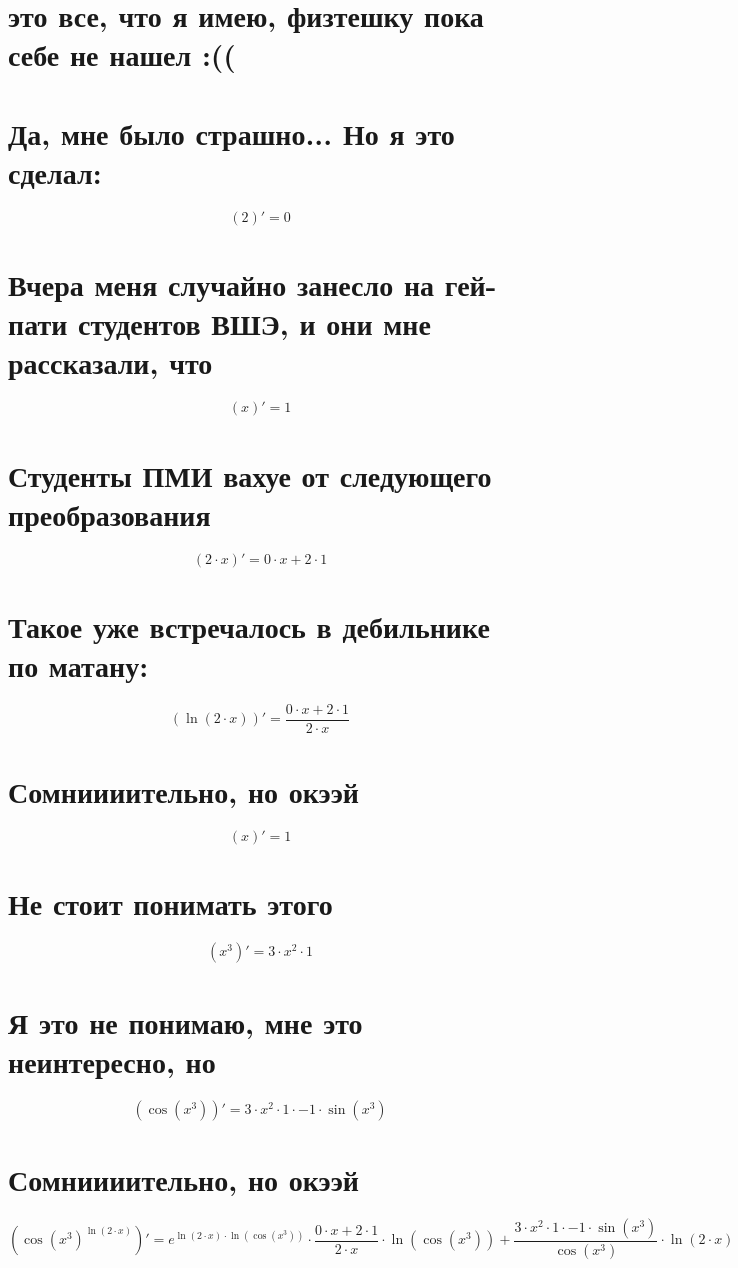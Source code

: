 \documentclass{article}
\begin{document}
\begin{Large}
\begin{onehalfspace}
\section*{это все, что я имею, физтешку пока себе не нашел :(( \\}\section*{Да, мне было страшно... Но я это сделал:}
$$(2)' = 0$$
\section*{Вчера меня случайно занесло на гей-пати студентов ВШЭ, и они мне рассказали, что}
$$(x)' = 1$$
\section*{Студенты ПМИ вахуе от следующего преобразования}
$$(2 \cdot x)' = 0 \cdot x + 2 \cdot 1$$
\section*{Такое уже встречалось в дебильнике по матану:}
$$(\ln(2 \cdot x))' = \frac{0 \cdot x + 2 \cdot 1}{2 \cdot x}$$
\section*{Сомниииительно, но окээй}
$$(x)' = 1$$
\section*{Не стоит понимать этого}
$$(x^{3})' = 3 \cdot x^{2} \cdot 1$$
\section*{Я это не понимаю, мне это неинтересно, но}
$$(\cos(x^{3}))' = 3 \cdot x^{2} \cdot 1 \cdot -1 \cdot \sin(x^{3})$$
\section*{Сомниииительно, но окээй}
$$(\cos(x^{3})^{\ln(2 \cdot x)})' = e^{\ln(2 \cdot x) \cdot \ln(\cos(x^{3}))} \cdot \frac{0 \cdot x + 2 \cdot 1}{2 \cdot x} \cdot \ln(\cos(x^{3})) + \frac{3 \cdot x^{2} \cdot 1 \cdot -1 \cdot \sin(x^{3})}{\cos(x^{3})} \cdot \ln(2 \cdot x)$$
\hline \vspace{1cm} \\

\end{onehalfspace}
\end{Large}
\end{document}
